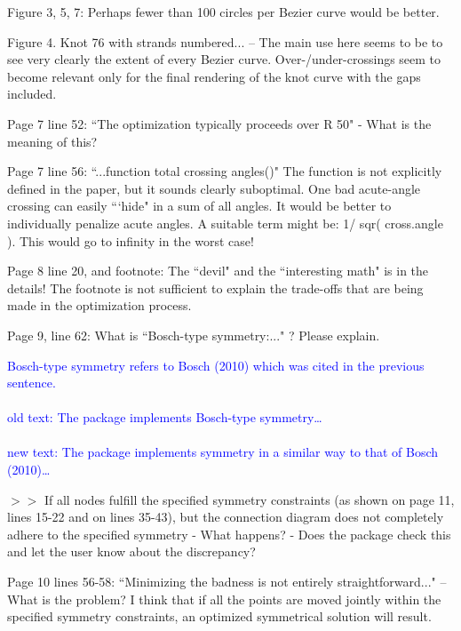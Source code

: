 \documentclass[12pt]{article}
\begin{document}
Figure 3, 5, 7: Perhaps fewer than 100 circles per Bezier curve would
be better.


Figure 4.  Knot 76 with strands numbered... -- The main use here seems
to be to see very clearly the extent of every Bezier curve.
Over-/under-crossings seem to become relevant only for the final
rendering of the knot curve with the gaps included.

Page 7 line 52: ``The optimization typically proceeds over R 50" - What
is the meaning of this?

Page 7 line 56: ``...function total crossing angles()" The function is
not explicitly defined in the paper, but it sounds clearly suboptimal.
One bad acute-angle crossing can easily ```hide" in a sum of all angles.
It would be better to individually penalize acute angles.  A suitable
term might be: 1/ sqr( cross.angle ).  This would go to infinity in
the worst case!

Page 8 line 20, and footnote: The ``devil" and the ``interesting math"
is in the details!  The footnote is not sufficient to explain the
trade-offs that are being made in the optimization process.

Page 9, line 62: What is ``Bosch-type symmetry:..." ?  Please explain.


\textcolor{blue}{Bosch-type symmetry refers to Bosch (2010) which was
  cited in the previous sentence.\\ \\ old text: The package
  implements Bosch-type symmetry\ldots \\ \\ new text: The package
  implements symmetry in a similar way to that of Bosch (2010)\ldots}
  
$>>$ If all nodes fulfill the specified symmetry constraints (as shown
on page 11, lines 15-22 and on lines 35-43), but the connection
diagram does not completely adhere to the specified symmetry - What
happens? - Does the package check this and let the user know about the
discrepancy?

Page 10 lines 56-58: ``Minimizing the badness is not entirely
straightforward..."  -- What is the problem?  I think that if all the
points are moved jointly within the specified symmetry constraints, an
optimized symmetrical solution will result.
\end{document}
